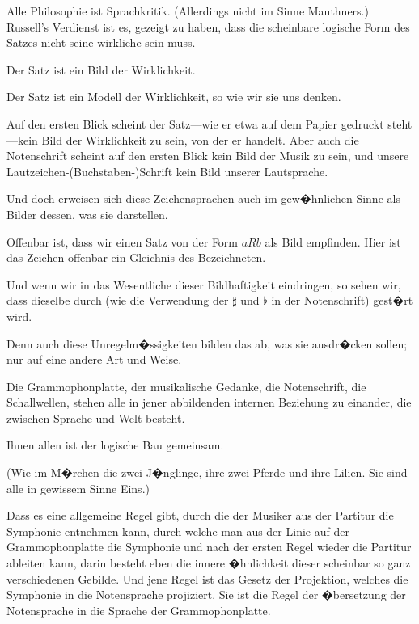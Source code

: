 \begin{propositions}
{Alle Philosophie ist \glqq{}Sprachkritik\grqq{}. (Allerdings
nicht im Sinne Mauthners.) Russell's Verdienst ist
es, gezeigt zu haben, dass die scheinbare logische
Form des Satzes nicht seine wirkliche sein muss.}


{Der Satz ist ein Bild der Wirklichkeit.

Der Satz ist ein Modell der Wirklichkeit, so wie
wir sie uns denken.}


{Auf den ersten Blick scheint der Satz---wie er
etwa auf dem Papier gedruckt steht---kein Bild der
Wirklichkeit zu sein, von der er handelt. Aber
auch die Notenschrift scheint auf den ers\-ten Blick
kein Bild der Musik zu sein, und unsere Lautzeichen-\mbox{(Buchstaben-)}\AllowBreak{}Schrift
kein Bild unserer Lautsprache.

Und doch erweisen sich diese Zeichensprachen
auch im gew�hnlichen Sinne als Bilder dessen, was
sie darstellen.}


{Offenbar ist, dass wir einen Satz von der Form
\glqq{}$aRb$\grqq{} als Bild empfinden. Hier ist das Zeichen
offenbar ein Gleichnis des Bezeichneten.}


{Und wenn wir in das Wesentliche dieser Bildhaftigkeit
eindringen, so sehen wir, dass dieselbe
durch 
(wie die Verwendung der $\sharp$ und $\flat$ in der Notenschrift)
 gest�rt wird.

Denn auch diese Unregelm�ssigkeiten bilden
das ab, was sie ausdr�cken sollen; nur auf eine
andere Art und Weise.}


{Die Grammophonplatte, der musikalische Gedanke,
die Notenschrift, die Schallwellen, stehen
alle in jener abbildenden internen Beziehung zu
einander, die zwischen Sprache und Welt besteht.

Ihnen allen ist der logische Bau gemeinsam.

(Wie im M�rchen die zwei J�nglinge, ihre zwei
Pferde und ihre Lilien. Sie sind alle in gewissem
Sinne Eins.)}


{Dass es eine allgemeine Regel gibt, durch die
der Musiker aus der Partitur die Symphonie
entnehmen kann, durch welche man aus der Linie
auf der Grammophonplatte die Symphonie und
nach der ersten Regel wieder die Partitur ableiten
kann, darin besteht eben die innere �hnlichkeit
dieser scheinbar so ganz verschiedenen Gebilde.
Und jene Regel ist das Gesetz der Projektion,
welches die Symphonie in die Notensprache projiziert.
Sie ist die Regel der �bersetzung der
Notensprache in die Sprache der Grammophonplatte.}



\end{propositions}
